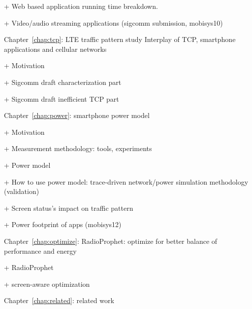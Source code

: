 	+ Web based application running time breakdown.

	+ Video/audio streaming applications (sigcomm submission, mobisys10)

	
Chapter~\ref{chap:tcp}: LTE traffic pattern study Interplay of TCP, smartphone applications and cellular networks

	+ Motivation

	+ Sigcomm draft characterization part

	+ Sigcomm draft inefficient TCP part
	
	
Chapter~\ref{chap:power}: smartphone power model

	+ Motivation

	+ Measurement methodology: tools, experiments

	+ Power model

	+ How to use power model: trace-driven network/power simulation methodology (validation)
	
	+ Screen status's impact on traffic pattern

	+ Power footprint of apps (mobisys12)
	
		
Chapter~\ref{chap:optimize}: RadioProphet: optimize for better balance of performance and energy

	+ RadioProphet

	+ screen-aware optimization
	
Chapter~\ref{chap:related}: related work
